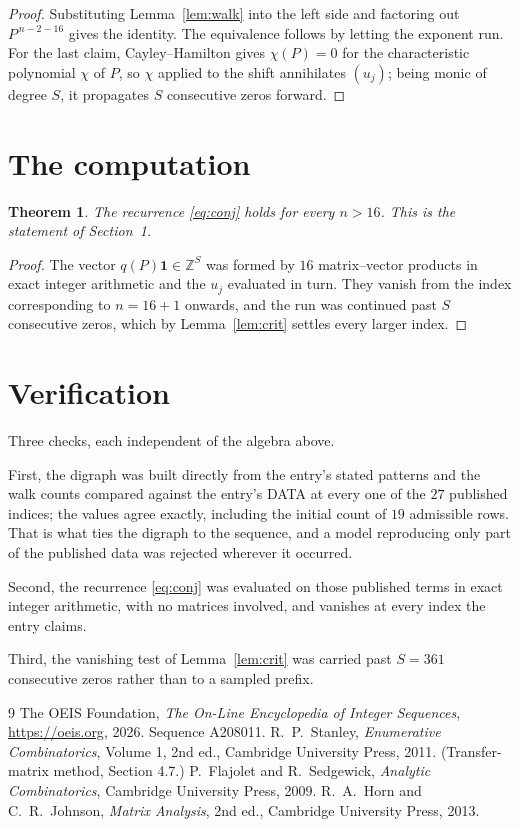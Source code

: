 \documentclass[11pt,a4paper]{article}
\theoremstyle{plain}
\newtheorem{theorem}{Theorem}
\theoremstyle{definition}
\begin{document}
\begin{proof}
Substituting Lemma~\ref{lem:walk} into the left side and factoring out
$P^{\,n-2-16}$ gives the identity. The equivalence follows by letting the exponent
run. For the last claim, Cayley--Hamilton gives $\chi(P)=0$ for the characteristic
polynomial $\chi$ of $P$, so $\chi$ applied to the shift annihilates $(u_j)$; being monic of
degree $S$, it propagates $S$ consecutive zeros forward.
\end{proof}

\section{The computation}

\begin{theorem}
The recurrence \eqref{eq:conj} holds for every $n>16$. This is the statement of
Section~1.
\end{theorem}

\begin{proof}
The vector $q(P)\mathbf{1}\in\mathbb{Z}^{S}$ was formed by $16$ matrix--vector
products in exact integer arithmetic and the $u_j$ evaluated in turn. They vanish from the
index corresponding to $n=16+1$ onwards, and the run was continued past $S$ consecutive
zeros, which by Lemma~\ref{lem:crit} settles every larger index.
\end{proof}

\section{Verification}

Three checks, each independent of the algebra above.

First, the digraph was built directly from the entry's stated patterns and the walk counts
compared against the entry's DATA at every one of the $27$ published indices; the
values agree exactly, including the initial count of $19$ admissible rows. That is
what ties the digraph to the sequence, and a model reproducing only part of the published
data was rejected wherever it occurred.

Second, the recurrence \eqref{eq:conj} was evaluated on those published terms in exact
integer arithmetic, with no matrices involved, and vanishes at every index the entry claims.

Third, the vanishing test of Lemma~\ref{lem:crit} was carried past $S=361$ consecutive
zeros rather than to a sampled prefix.

\begin{thebibliography}{9}
 The OEIS Foundation, \emph{The On-Line Encyclopedia of Integer
Sequences}, \url{https://oeis.org}, 2026. Sequence A208011.
 R.~P.~Stanley, \emph{Enumerative Combinatorics}, Volume 1, 2nd ed.,
Cambridge University Press, 2011. (Transfer-matrix method, Section 4.7.)
 P.~Flajolet and R.~Sedgewick, \emph{Analytic Combinatorics}, Cambridge
University Press, 2009.
 R.~A.~Horn and C.~R.~Johnson, \emph{Matrix Analysis}, 2nd ed., Cambridge
University Press, 2013.
\end{thebibliography}
\end{document}
